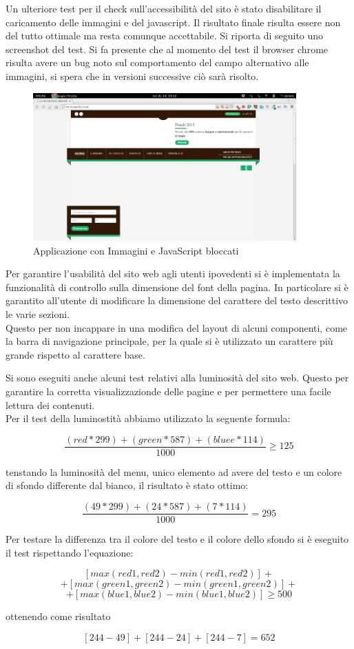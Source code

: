 \documentclass[a4paper,12pt,hidelinks]{report}
\begin{document}
\newpage
\par Un ulteriore test per il check sull'accessibilità del sito è stato disabilitare il caricamento delle immagini e del javascript. Il risultato finale risulta essere non del 
tutto ottimale ma resta comunque accettabile. Si riporta di seguito uno screenshot del test. Si fa presente che al momento del test il browser chrome risulta avere un bug 
noto sul comportamento del campo alternativo alle immagini, si spera che in versioni successive ciò sarà risolto.
\begin{figure}[h!]%
    \includegraphics[width=0.9\textwidth,keepaspectratio=true]{../img/noJsNoImg}
    \centering
    \caption{Applicazione con Immagini e JavaScript bloccati}%
    \label{fig:noJsNoImg}%
\end{figure}

\newpage
\par Per garantire l'usabilità del sito web agli utenti ipovedenti si è implementata la funzionalità di controllo sulla dimensione del font della pagina.
In particolare si è garantito all'utente di modificare la dimensione del carattere del testo descrittivo le varie sezioni. 
\\Questo per non incappare in una modifica del layout di alcuni componenti, come la barra di navigazione
principale, per la quale si è utilizzato un carattere più grande rispetto al carattere base.
\par Si sono eseguiti anche alcuni test relativi alla luminosità del sito web. Questo per garantire la corretta visualizzazionde delle pagine e per permettere una facile lettura dei
contenuti.
\\Per il test della luminostità abbiamo utilizzato la seguente formula:

\[\frac{(red*299)+(green*587)+(bluee*114)}{1000} \geq {125}\]

tenstando la luminosità del menu, unico elemento ad avere del testo e un colore di sfondo differente dal bianco, il risultato è stato ottimo:

\[ \frac{(49*299)+(24*587)+(7*114)}{1000} = 295 \]

Per testare la differenza tra il colore del testo e il colore dello sfondo si è eseguito il test rispettando l'equazione:


\[[max(red1,red2)-min(red1,red2)]+ \]
\[+[max(green1,green2)-min(green1,green2)]+ \] 
\[+[max(blue1,blue2)-min(blue1,blue2)] \geq{500}\]

ottenendo come risultato

\[[244-49]+[244-24]+[244-7]={652}\]
\end{document}
